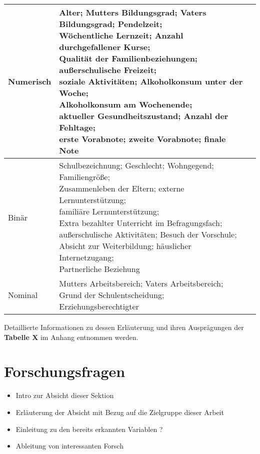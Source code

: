 %
\begin{table}[htb]
    \centering
    \begin{tabular}{|l|l|l|}
    \hline
        Numerisch & \makecell[l]{Alter; Mutters Bildungsgrad; Vaters Bildungsgrad; Pendelzeit; \\Wöchentliche Lernzeit; Anzahl durchgefallener Kurse; \\Qualität der Familienbeziehungen; außerschulische Freizeit; \\soziale Aktivitäten; Alkoholkonsum unter der Woche; \\Alkoholkonsum am Wochenende; \\aktueller Gesundheitszustand; Anzahl der Fehltage; \\\textbf{erste Vorabnote; zweite Vorabnote; finale Note}} \\ \hline
        Binär & \makecell[l]{Schulbezeichnung; Geschlecht; Wohngegend; Familiengröße; \\Zusammenleben der Eltern; externe Lernunterstützung; \\familiäre Lernunterstützung; \\Extra bezahlter Unterricht im Befragungsfach; \\außerschulische Aktivitäten; Besuch der Vorschule; \\Absicht zur Weiterbildung; häuslicher Internetzugang; \\Partnerliche Beziehung} \\ \hline
        Nominal & \makecell[l]{Mutters Arbeitsbereich; Vaters Arbeitsbereich; \\Grund der Schulentscheidung; Erziehungsberechtigter} \\ \hline
    \end{tabular}
\end{table}

Detaillierte Informationen zu dessen Erläuterung und ihren Ausprägungen der \textbf{Tabelle X} im Anhang entnommen werden.

\section[Forschungsfragen]{Forschungsfragen}

\begin{itemize}
    \item Intro zur Absicht dieser Sektion
    \item Erläuterung der Absicht mit Bezug auf die Zielgruppe dieser Arbeit
    \item Einleitung zu den bereits erkannten Variablen ?
    \item Ableitung von interessanten Forsch
\end{itemize}